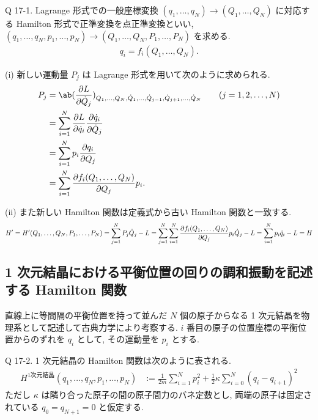 \documentclass[uplatex,diffipdfmx,a4paper,11pt]{jlreq}
\theoremstyle{definition}
\begin{document}
\begin{itembox}[l]{Q 17-1.}
  Lagrange 形式での一般座標変換 $(q_1,\ldots,q_N)\to(Q_1,\ldots,Q_N)$ に対応する Hamilton 形式で正準変換を点正準変換といい, $(q_1,\ldots,q_N,p_1,\ldots,p_N)\to(Q_1,\ldots,Q_N,P_1,\ldots,P_N)$ を求める.
  \begin{align}
    q_i = f_i(Q_1,\ldots,Q_N).
  \end{align}
\end{itembox}

(i) 新しい運動量 $P_j$ は Lagrange 形式を用いて次のように求められる.
\begin{align}
  P_j & = \ab(\diffp{L}{\dot{Q}_j})_{Q_1,\ldots,Q_N,\dot{Q}_1,\ldots,\dot{Q}_{j-1},\dot{Q}_{j+1},\ldots,\dot{Q}_N} \qquad (j=1,2,\ldots,N) \\
      & = \sum_{i=1}^{N}\diffp{L}{\dot{q}_i}\diffp{\dot{q}_i}{\dot{Q}_j}                                                                   \\
      & = \sum_{i=1}^{N}p_i\diffp{q_i}{Q_j}                                                                                                \\
      & = \sum_{i=1}^{N}\diffp{f_i(Q_1,\ldots,Q_N)}{Q_j}p_i.
\end{align}

(ii) また新しい Hamilton 関数は定義式から古い Hamilton 関数と一致する.
\begin{align}
  H' = H'(Q_1,\ldots,Q_N,P_1,\ldots,P_N) = \sum_{j=1}^{N}P_j\dot{Q}_j - L = \sum_{j=1}^{N}\sum_{i=1}^{N}\diffp{f_i(Q_1,\ldots,Q_N)}{Q_j}p_i\dot{Q}_j - L = \sum_{i=1}^{N}p_i\dot{q}_i - L = H
\end{align}

\subsection{1 次元結晶における平衡位置の回りの調和振動を記述する Hamilton 関数}
直線上に等間隔の平衡位置を持って並んだ $N$ 個の原子からなる 1 次元結晶を物理系として記述して古典力学により考察する. $i$ 番目の原子の位置座標の平衡位置からのずれを $q_i$ として, その運動量を $p_i$ とする.
\begin{itembox}[l]{Q 17-2.}
  1 次元結晶の Hamilton 関数は次のように表される.
  \begin{align}
    H^{1次元結晶}(q_1,\ldots,q_N, p_1,\ldots,p_N) & := \frac{1}{2m}\sum_{i=1}^{N}p_i^2 + \frac{1}{2}\kappa\sum_{i=0}^{N}(q_i - q_{i+1})^2
  \end{align}
  ただし $\kappa$ は隣り合った原子の間の原子間力のバネ定数とし, 両端の原子は固定されている $q_0 = q_{N+1} = 0$ と仮定する.
\end{itembox}
\end{document}
